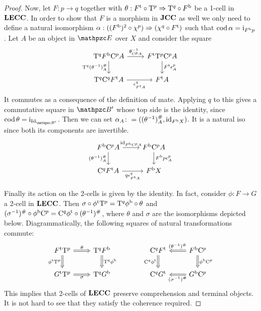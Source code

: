 \documentclass{lmcs} %
\theoremstyle{plain}\newtheorem{satz}[thm]{Satz} %
\begin{document}
\begin{proof}
				Now, let $F:p\to q$ together with $\theta:{F}^{\mathrm{t}}\circ \mathrm{T}^{p}\Rightarrow \mathrm{T}^{q}\circ {F}^{\mathrm{b}}$ be a 1-cell in $\mathbf{LECC}$. In order to show that $F$ is a morphism in $\mathbf{JCC}$ as well we only need to define a natural isomorphism $\alpha:(({F}^{\mathrm{b}})^{2}\circ \chi^{p})\Rightarrow (\chi^{q}\circ {F}^{\mathrm{t}})$ such that $\mathop{\mathrm{cod}}\nolimits\alpha=\mathrm{i}_{{F}^{\mathrm{b}}p}$. Let $A$ be an object in $\ct{E}$ over $X$ and consider the square 
				\[\begin{tikzcd}
					{\term{q}\fb{F}\comp{p}A} & {\ft{F}\term{p}\comp{p}A} \\
					{\term{q}\comp{q}\ft{F}A} & {\ft{F}A}
					\arrow["{\theta^{-1}_{\comp{p}A}}", from=1-1, to=1-2]
					\arrow["{\term{q}\mate{(\theta^{-1})}_A}"', from=1-1, to=2-1]
					\arrow["{\ft{F}\coun{p}_A}", from=1-2, to=2-2]
					\arrow["{\coun{q}_{\ft{F}A}}"', from=2-1, to=2-2]
				\end{tikzcd}\]
				It commutes as a consequence of the definition of mate. Applying $q$ to this gives a commutative square in $\ct{B'}$ whose top side is the identity, since $\lwhisk{\cod}\theta=\idtwo{\Id{\ct{B'}}}$. Then we can set $\alpha_A\colon=((\theta^{-1})^{\#}_A,\mathrm{id}_{{F}^{\mathrm{b}}X})$. It is a natural iso since both its components are invertible.
				\[\begin{tikzcd}
					{\fb{F}\comp{p}A} & {\fb{F}\comp{p}A} \\
					{\comp{q}\ft{F}A} & {\fb{F}X}
					\arrow["{\id{\fb{F}\comp{p}A}}", from=1-1, to=1-2]
					\arrow["{\mate{(\theta^{-1})}_A}"', from=1-1, to=2-1]
					\arrow["{\fb{F}p\coun{p}_A}", from=1-2, to=2-2]
					\arrow["{q\coun{q}_{\ft{F}A}}"', from=2-1, to=2-2]
				\end{tikzcd}\]
				
				Finally its action on the 2-cells is given by the identity. 
				In fact, consider $\phi:F\to G$ a 2-cell in $\mathbf{LECC}$. Then $\sigma\circ{\phi}^{\mathrm{t}}\mathrm{T}^{p}=\mathrm{T}^{q}{\phi}^{\mathrm{b}}\circ \theta$ and $(\sigma^{-1})^{\#}\circ{\phi}^{\mathrm{b}}\mathrm{C}^{p}=\mathrm{C}^{q}{\phi}^{\mathrm{t}}\circ(\theta^{-1})^{\#}$, where $\theta$ and $\sigma$ are the isomorphisms depicted below. Diagrammatically, the following squares of natural transformations commute:
				\[\begin{tikzcd}
					{\ft{F}\term{p}} & {\term{q}\fb{F}} && {\comp{q}\ft{F}} & {\fb{F}\comp{p}} \\
					{\ft{G}\term{p}} & {\term{q}\fb{G}} && {\comp{q}\ft{G}} & {\fb{G}\comp{p}}
					\arrow["\theta", Rightarrow, from=1-1, to=1-2]
					\arrow["{\ft{\phi}\rwhisk{\term{p}}}"', Rightarrow, from=1-1, to=2-1]
					\arrow["{\lwhisk{\term{q}}\fb{\phi}}", Rightarrow, from=1-2, to=2-2]
					\arrow["{\lwhisk{\comp{q}}\ft{\phi}}"', Rightarrow, from=1-4, to=2-4]
					\arrow["{\mate{(\theta^{-1})}}"', Rightarrow, from=1-5, to=1-4]
					\arrow["{\fb{\phi}\rwhisk{\comp{p}}}", Rightarrow, from=1-5, to=2-5]
					\arrow["\sigma"', Rightarrow, from=2-1, to=2-2]
					\arrow["{\mate{(\sigma^{-1})}}", Rightarrow, from=2-5, to=2-4]
				\end{tikzcd}\]
				This implies that 2-cells of $\mathbf{LECC}$ preserve comprehension and terminal objects. It is not hard to see that they satisfy the coherence required.
			\end{proof}
\end{document}
